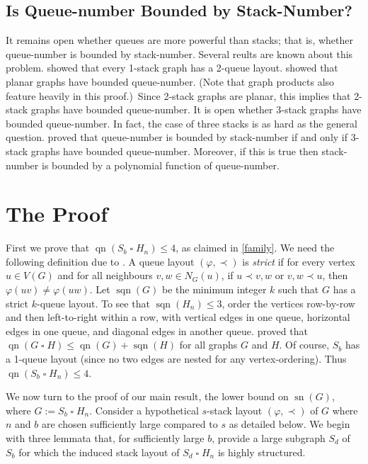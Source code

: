 \documentclass[kpfonts]{patmorin}
\DeclareMathOperator{\sn}{sn}
\DeclareMathOperator{\qn}{qn}
\DeclareMathOperator{\sqn}{sqn}
\renewcommand{\leq}{\leqslant}
\newcommand{\CartProd}{\mathbin{\square}}
\begin{document}
\subsection*{Is Queue-number Bounded by Stack-Number? }

It remains open whether queues are more powerful than stacks; that is, whether queue-number is bounded by stack-number. Several reults are known about this problem. \citet{HLR92} showed that every 1-stack graph has a 2-queue layout. \citet{DJMMUW20} showed that planar graphs have bounded queue-number. (Note that graph products also feature heavily in this proof.)\ Since 2-stack graphs are planar, this implies that 2-stack graphs have bounded queue-number. It is open whether 3-stack graphs have bounded queue-number. In fact, the case of three stacks is as hard as the general question. \citet{DujWoo05} proved that queue-number is bounded by stack-number if and only if 3-stack graphs have bounded queue-number. Moreover, if this is true then stack-number is bounded by a polynomial function of queue-number.


\section{The Proof}

First we prove that $\qn(S_b\CartProd H_n)\leq 4$, as claimed in \cref{family}. We need the following definition due to \citet{Wood-Queue-DMTCS05}. A queue layout $(\varphi,\prec)$ is \emph{strict} if for every vertex $u\in V(G)$ and for all neighbours $v,w\in N_G(u)$, if $u\prec v,w$ or $v,w \prec u$, then $\varphi(uv)\neq \varphi(uw)$. Let $\sqn(G)$ be the minimum integer $k$ such that $G$ has a strict $k$-queue layout. To see that $\sqn(H_n) \leq 3$, order the vertices row-by-row and then left-to-right within a row, with vertical edges in one queue, horizontal edges in one queue, and diagonal edges in another queue.
\citet{Wood-Queue-DMTCS05} proved that $\qn(G \CartProd H) \leq \qn(G) + \sqn(H)$ for all graphs $G$ and $H$. Of course, $S_b$ has a 1-queue layout (since no two edges are nested for any vertex-ordering). Thus $\qn(S_b \CartProd H_n)\leq 4$.


\bigskip We now turn to the proof of our main result, the lower bound on $\sn(G)$, where $G:= S_b\CartProd H_n$. Consider a hypothetical $s$-stack layout $(\varphi,\prec)$ of $G$ where $n$ and $b$ are chosen sufficiently large compared to $s$ as detailed below. We begin with three lemmata that, for sufficiently large $b$, provide a large subgraph $S_d$ of $S_b$ for which the induced stack layout of $S_d\CartProd H_n$ is highly structured.
\end{document}
